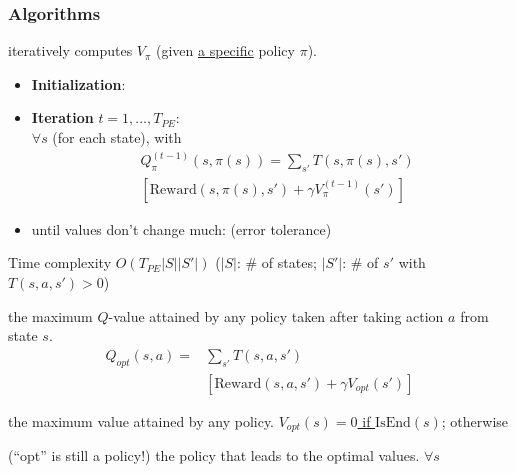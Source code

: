 
\subsubsection{Algorithms}

 iteratively computes $V_\pi$ (given \underline{a
specific} policy $\pi$).
\begin{itemize}
    \item \textbf{Initialization}: 
    \item \textbf{Iteration} $t = 1,\dots,T_{PE}$:\\
        $\forall s$ (for each state), 
        with \begin{displaymath}
            \boxed{
                \begin{aligned}
                    &Q_\pi^{(t-1)}(s,\pi(s)) = \sum_{s'}T(s,\pi(s),s')\\
                    &\left[\text{Reward}(s,\pi(s),s') + \gamma V_\pi^{(t-1)}(s')\right]
                \end{aligned}
            }
        \end{displaymath}
    \item until values don't change much: 
        (error tolerance)
\end{itemize}
Time complexity $O(T_{PE}|S||S'|)$ ($|S|$: \# of states; $|S'|$: \# of $s'$ with $T(s,a,s') > 0$)

 the maximum $Q$-value
attained by any policy taken after taking action $a$ from state $s$.
\begin{displaymath}
\boxed{
\begin{aligned}
    Q_{opt}(s,a) =& \sum_{s'}T(s,a,s')\\
    &\left[\text{Reward}(s,a,s') + \gamma V_{opt}(s')\right]
\end{aligned}
}
\end{displaymath}

 the maximum value attained by any policy.
\underline{$V_{opt}(s) = 0$ if $\text{IsEnd}(s)$};
otherwise 

 (``opt'' is still a policy!) the policy that leads
to the optimal values.
$\forall s$ 

